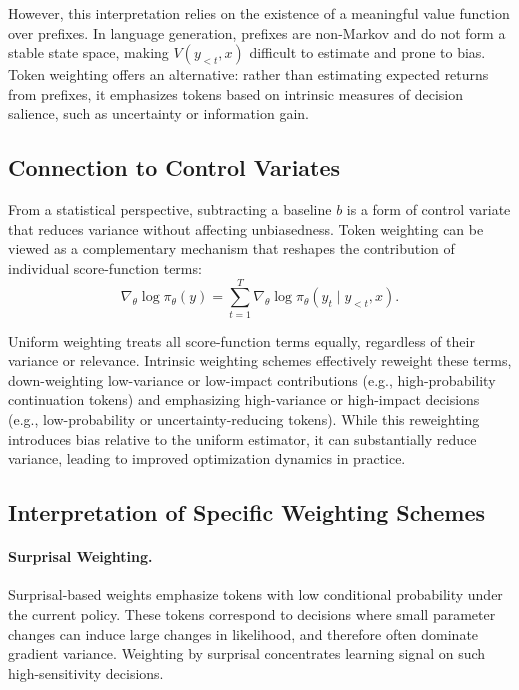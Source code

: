 However, this interpretation relies on the existence of a meaningful value function over prefixes. In language generation, prefixes are non-Markov and do not form a stable state space, making $V(y_{<t}, x)$ difficult to estimate and prone to bias. Token weighting offers an alternative: rather than estimating expected returns from prefixes, it emphasizes tokens based on intrinsic measures of decision salience, such as uncertainty or information gain.

\subsection{Connection to Control Variates}

From a statistical perspective, subtracting a baseline $b$ is a form of control variate that reduces variance without affecting unbiasedness. Token weighting can be viewed as a complementary mechanism that reshapes the contribution of individual score-function terms:
\begin{equation}
\nabla_\theta \log \pi_\theta(y) = \sum_{t=1}^{T} \nabla_\theta \log \pi_\theta(y_t \mid y_{<t}, x).
\end{equation}

Uniform weighting treats all score-function terms equally, regardless of their variance or relevance. Intrinsic weighting schemes effectively reweight these terms, down-weighting low-variance or low-impact contributions (e.g., high-probability continuation tokens) and emphasizing high-variance or high-impact decisions (e.g., low-probability or uncertainty-reducing tokens). While this reweighting introduces bias relative to the uniform estimator, it can substantially reduce variance, leading to improved optimization dynamics in practice.

\subsection{Interpretation of Specific Weighting Schemes}

\paragraph{Surprisal Weighting.}
Surprisal-based weights emphasize tokens with low conditional probability under the current policy. These tokens correspond to decisions where small parameter changes can induce large changes in likelihood, and therefore often dominate gradient variance. Weighting by surprisal concentrates learning signal on such high-sensitivity decisions.

